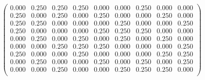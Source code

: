 \documentclass[border=1em]{standalone}
\begin{document}
$
\left(
\begin{array}{ccccccccc}
0.000 & 0.250 & 0.250 & 0.250 & 0.000 & 0.000 & 0.250 & 0.000 & 0.000 \\
0.250 & 0.000 & 0.250 & 0.000 & 0.250 & 0.000 & 0.000 & 0.250 & 0.000 \\
0.250 & 0.250 & 0.000 & 0.000 & 0.000 & 0.250 & 0.000 & 0.000 & 0.250 \\
0.250 & 0.000 & 0.000 & 0.000 & 0.250 & 0.250 & 0.250 & 0.000 & 0.000 \\
0.000 & 0.250 & 0.000 & 0.250 & 0.000 & 0.250 & 0.000 & 0.250 & 0.000 \\
0.000 & 0.000 & 0.250 & 0.250 & 0.250 & 0.000 & 0.000 & 0.000 & 0.250 \\
0.250 & 0.000 & 0.000 & 0.250 & 0.000 & 0.000 & 0.000 & 0.250 & 0.250 \\
0.000 & 0.250 & 0.000 & 0.000 & 0.250 & 0.000 & 0.250 & 0.000 & 0.250 \\
0.000 & 0.000 & 0.250 & 0.000 & 0.000 & 0.250 & 0.250 & 0.250 & 0.000 \\
\end{array}
\right)
$
\end{document}

